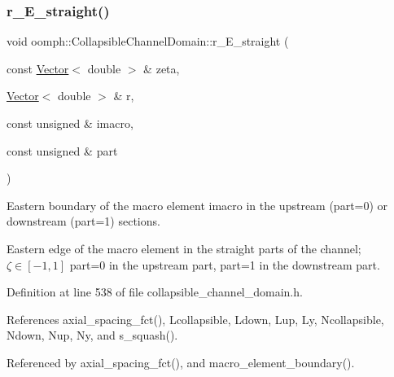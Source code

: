 \mbox{\label{classoomph_1_1CollapsibleChannelDomain_a1f880915f7c2f9163fc1ec8cac676831}} 
\subsubsection{\texorpdfstring{r\+\_\+\+E\+\_\+straight()}{r\_E\_straight()}}
{\footnotesize\ttfamily void oomph\+::\+Collapsible\+Channel\+Domain\+::r\+\_\+\+E\+\_\+straight (\begin{DoxyParamCaption}\item[{const \hyperlink{classoomph_1_1Vector}{Vector}$<$ double $>$ \&}]{zeta,  }\item[{\hyperlink{classoomph_1_1Vector}{Vector}$<$ double $>$ \&}]{r,  }\item[{const unsigned \&}]{imacro,  }\item[{const unsigned \&}]{part }\end{DoxyParamCaption})\hspace{0.3cm}{\ttfamily [private]}}



Eastern boundary of the macro element imacro in the upstream (part=0) or downstream (part=1) sections. 

Eastern edge of the macro element in the straight parts of the channel; $ \zeta \in [-1,1] $ part=0 in the upstream part, part=1 in the downstream part. 

Definition at line 538 of file collapsible\+\_\+channel\+\_\+domain.\+h.



References axial\+\_\+spacing\+\_\+fct(), Lcollapsible, Ldown, Lup, Ly, Ncollapsible, Ndown, Nup, Ny, and s\+\_\+squash().



Referenced by axial\+\_\+spacing\+\_\+fct(), and macro\+\_\+element\+\_\+boundary().

\mbox{\label{classoomph_1_1CollapsibleChannelDomain_a0044d3e848b4c643a8a30f4f00a88e8d}} 
